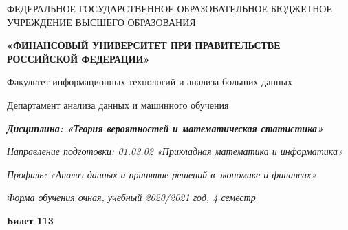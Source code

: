 \documentclass[a4paper,14pt]{article}
\begin{document}
\begin{center}
ФЕДЕРАЛЬНОЕ ГОСУДАРСТВЕННОЕ ОБРАЗОВАТЕЛЬНОЕ БЮДЖЕТНОЕ УЧРЕЖДЕНИЕ ВЫСШЕГО ОБРАЗОВАНИЯ

    \textbf{«ФИНАНСОВЫЙ УНИВЕРСИТЕТ ПРИ ПРАВИТЕЛЬСТВЕ РОССИЙСКОЙ ФЕДЕРАЦИИ»}

Факультет информационных технологий и анализа больших данных

Департамент анализа данных и машинного обучения

\textit{
	\textbf{Дисциплина: «Теория вероятностей и математическая статистика»}}

\textit{Направление подготовки: 01.03.02 «Прикладная математика и информатика»}

\textit{Профиль: «Анализ данных и принятие решений в экономике и финансах»}

\textit{Форма обучения очная, учебный 2020/2021 год, 4 семестр}

\textbf{Билет 113}

\end{center}
\end{document}
